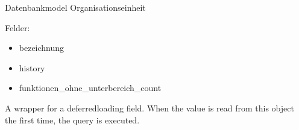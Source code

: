 \documentclass[letterpaper,10pt,english]{sphinxmanual}
\begin{document}
\begin{fulllineitems}
\label{\detokenize{masterCodeDoc:aemter.models.Organisationseinheit}}
Datenbankmodel Organisationseinheit

Felder:
\begin{itemize}
\item {} 
bezeichnung

\item {} 
history

\item {} 
funktionen\_ohne\_unterbereich\_count

\end{itemize}

\begin{fulllineitems}
\label{\detokenize{masterCodeDoc:aemter.models.Organisationseinheit.DoesNotExist}}
\end{fulllineitems}


\begin{fulllineitems}
\label{\detokenize{masterCodeDoc:aemter.models.Organisationseinheit.MultipleObjectsReturned}}
\end{fulllineitems}


\begin{fulllineitems}
\label{\detokenize{masterCodeDoc:aemter.models.Organisationseinheit.bezeichnung}}
A wrapper for a deferred\sphinxhyphen{}loading field. When the value is read from this
object the first time, the query is executed.

\end{fulllineitems}



\end{fulllineitems}
\end{document}
